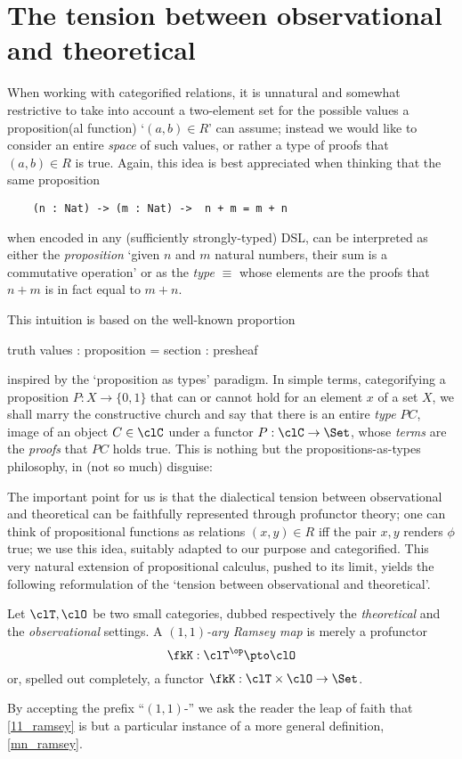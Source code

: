 \section{The tension between observational and theoretical}
\label{sec:orge11c3c4}
When working with categorified relations, it is unnatural and somewhat restrictive to take into account a two-element set for the possible values a proposition(al function) `$(a,b)\in R$' can assume; instead we would like to consider an entire \emph{space} of such values, or rather a type of proofs that $(a,b)\in R$ is true. Again, this idea is best appreciated when thinking that the same proposition 
\begin{center}
	\begin{verbatim}
	(n : Nat) -> (m : Nat) ->  n + m = m + n 
	\end{verbatim}
\end{center}
when encoded in any (sufficiently strongly-typed) DSL, can be interpreted as either the \emph{proposition} `given $n$ and $m$ natural numbers, their sum is a commutative operation' or as the \emph{type}  $\equiv$  whose elements are the proofs that $n+m$ is in fact equal to $m+n$.

This intuition is based on the well-known proportion
\begin{center}
	truth values : proposition = section : presheaf
\end{center}
inspired by the `proposition as types' paradigm. In simple terms, categorifying a proposition $P : X\to \{0,1\}$ that can or cannot hold for an element $x$ of a set $X$, we shall marry the constructive church and say that there is an entire \emph{type} $PC$, image of an object $C\in\clC$ under a functor $P : \clC \to \Set$, whose \emph{terms} are the \emph{proofs} that $PC$ holds true. This is nothing but the propositions-as-types philosophy, in (not so much) disguise: \cite{hottbook,wadler,martin1984intuitionistic}

The important point for us is that the dialectical tension between observational and theoretical can be faithfully represented through profunctor theory; one can think of propositional functions as relations $(x,y)\in R$ iff the pair $x,y$ renders $\phi$ true; we use this idea, suitably adapted to our purpose and categorified. This very natural extension of propositional calculus, pushed to its limit, yields the following reformulation of the `tension between observational and theoretical'.%
\begin{definition}\label{11_ramsey}
	Let $\clT,\clO$ be two small categories, dubbed respectively the \emph{theoretical} and the \emph{observational} settings. A \emph{$(1,1)$-ary Ramsey map} is merely a profunctor
	\[\fkK : \clT^\op \pto \clO\]
	or, spelled out completely, a functor $\fkK : \clT\times \clO \to \Set$.
\end{definition}
By accepting the prefix ``$(1,1)$-'' we ask the reader the leap of faith that \autoref{11_ramsey} is but a particular instance of a more general definition, \autoref{mn_ramsey}. 

